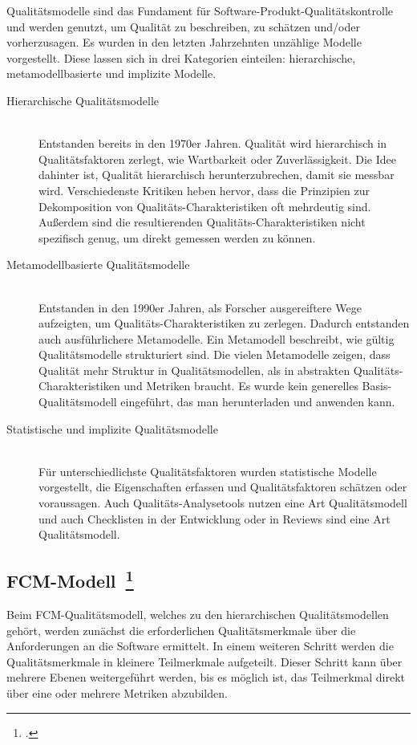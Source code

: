 Qualitätsmodelle sind das Fundament für Software-Produkt-Qualitätskontrolle und werden genutzt, um Qualität zu beschreiben, zu schätzen und/oder vorherzusagen.
Es wurden in den letzten Jahrzehnten unzählige Modelle vorgestellt.
Diese lassen sich in drei Kategorien einteilen: hierarchische, metamodellbasierte und implizite Modelle.

\begin{description}
  \item[Hierarchische Qualitätsmodelle] \hfill \\ Entstanden bereits in den 1970er Jahren. Qualität wird hierarchisch in Qualitätsfaktoren zerlegt, wie Wartbarkeit oder Zuverlässigkeit. Die Idee dahinter ist, Qualität hierarchisch herunterzubrechen, damit sie messbar wird. Verschiedenste Kritiken heben hervor, dass die Prinzipien zur Dekomposition von Qualitäts-Charakteristiken oft mehrdeutig sind. Außerdem sind die resultierenden Qualitäts-Charakteristiken nicht spezifisch genug, um direkt gemessen werden zu können.
  \item[Metamodellbasierte Qualitätsmodelle] \hfill \\ Entstanden in den 1990er Jahren, als Forscher ausgereiftere Wege aufzeigten, um Qualitäts-Charakteristiken zu zerlegen. Dadurch entstanden auch ausführlichere Metamodelle. Ein Metamodell beschreibt, wie gültig Qualitätsmodelle strukturiert sind. Die vielen Metamodelle zeigen, dass Qualität mehr Struktur in Qualitätsmodellen, als in abstrakten Qualitäts-Charakteristiken und Metriken braucht. Es wurde kein generelles Basis-Qualitätsmodell eingeführt, das man herunterladen und anwenden kann.
  \item[Statistische und implizite Qualitätsmodelle] \hfill \\ Für unterschiedlichste Qualitätsfaktoren wurden statistische Modelle vorgestellt, die Eigenschaften erfassen und Qualitätsfaktoren schätzen oder voraussagen. Auch Qualitäts-Analysetools nutzen eine Art Qualitätsmodell und auch Checklisten in der Entwicklung oder in Reviews sind eine Art Qualitätsmodell.
\end{description}

\clearpage
\subsection[\ac{FCM}-Modell]{\acf{FCM}-Modell~\footcite[vgl.][S.668ff]{abts_masterkurs_2009}}

Beim \ac{FCM}-Qualitätsmodell, welches zu den hierarchischen Qualitätsmodellen gehört, werden zunächst die erforderlichen Qualitätsmerkmale über die Anforderungen an die Software ermittelt.
In einem weiteren Schritt werden die Qualitätsmerkmale in kleinere Teilmerkmale aufgeteilt.
Dieser Schritt kann über mehrere Ebenen weitergeführt werden, bis es möglich ist, das Teilmerkmal direkt über eine oder mehrere Metriken abzubilden.

